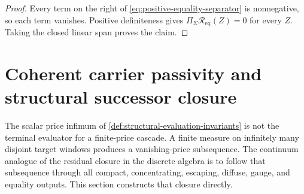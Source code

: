 \documentclass[11pt]{article}
\numberwithin{section}{part}
\theoremstyle{plain}
\theoremstyle{definition}
\theoremstyle{remark}
\begin{document}
\begin{proof}
Every term on the right of \eqref{eq:positive-equality-separator} is
nonnegative, so each term vanishes.  Positive definiteness gives
\(\Pi_\Sigma\mathscr R_{\mathrm{eq}}(Z)=0\) for every \(Z\).  Taking the
closed linear span proves the claim.
\end{proof}

\section{Coherent carrier passivity and structural successor closure}
\label{sec:carrier-passivity-successors}

The scalar price infimum of
\cref{def:structural-evaluation-invariants} is not the terminal evaluator for
a finite-price cascade.  A finite measure on infinitely many disjoint target
windows produces a vanishing-price subsequence.  The continuum analogue of
the residual closure in the discrete algebra is to follow that subsequence
through all compact, concentrating, escaping, diffuse, gauge, and equality
outputs.  This section constructs that closure directly.
\end{document}
